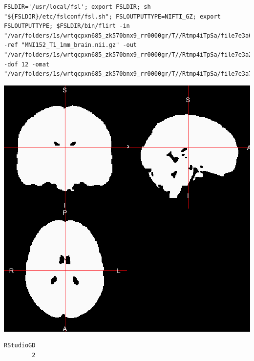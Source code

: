 \documentclass[11pt]{beamer}\usepackage[]{graphicx}\usepackage[]{color}
\makeatletter
\newenvironment{kframe}{%
 \def\at@end@of@kframe{}%
 \ifinner\ifhmode%
  \def\at@end@of@kframe{\end{minipage}}%
  \begin{minipage}{\columnwidth}%
 \fi\fi%
 \def\FrameCommand##1{\hskip\@totalleftmargin \hskip-\fboxsep
 \colorbox{shadecolor}{##1}\hskip-\fboxsep
     \hskip-\linewidth \hskip-\@totalleftmargin \hskip\columnwidth}%
 \MakeFramed {\advance\hsize-\width
   \@totalleftmargin\z@ \linewidth\hsize
   \@setminipage}}%
 {\par\unskip\endMakeFramed%
 \at@end@of@kframe}
\newenvironment{knitrout}{}{} %
\makeatother
\begin{document}
\begin{knitrout}
\color{fgcolor}\begin{kframe}
\begin{verbatim}
FSLDIR='/usr/local/fsl'; export FSLDIR; sh "${FSLDIR}/etc/fslconf/fsl.sh"; FSLOUTPUTTYPE=NIFTI_GZ; export FSLOUTPUTTYPE; $FSLDIR/bin/flirt -in "/var/folders/1s/wrtqcpxn685_zk570bnx9_rr0000gr/T//Rtmp4iTpSa/file7e3a619ccf8f.nii.gz" -ref "MNI152_T1_1mm_brain.nii.gz" -out "/var/folders/1s/wrtqcpxn685_zk570bnx9_rr0000gr/T//Rtmp4iTpSa/file7e3a2f8d3cf4" -dof 12 -omat "/var/folders/1s/wrtqcpxn685_zk570bnx9_rr0000gr/T//Rtmp4iTpSa/file7e3a7dfee759.mat"  
\end{verbatim}
\end{kframe}
\includegraphics[width=\textwidth,height=0.5\textheight,keepaspectratio]{figure/image_affine_bet-1} 
\begin{kframe}\begin{verbatim}
RStudioGD 
        2 
\end{verbatim}
\end{kframe}
\end{knitrout}
\end{document}
